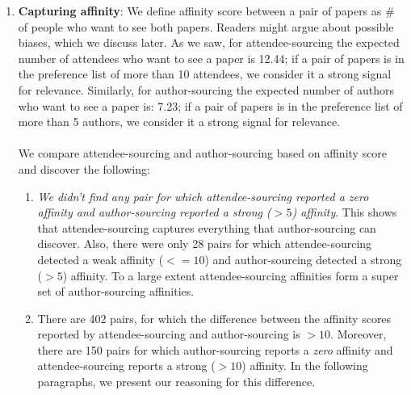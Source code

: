 \documentclass[letterpaper]{article}
\begin{document}
\begin{enumerate}
\item \textbf{Capturing affinity}: We define affinity score between a pair of papers as \# of people who want to see both papers. Readers might argue about possible biases, which we discuss later. As we saw, for attendee-sourcing the expected number of attendees who want to see a paper is 12.44; if a pair of papers is in the preference list of more than 10 attendees, we consider it a strong signal for relevance. Similarly, for author-sourcing the expected number of authors who want to see a paper is: 7.23; if a pair of papers is in the preference list of more than 5 authors, we consider it a strong signal for relevance.
\\
\\
We compare attendee-sourcing and author-sourcing based on affinity score and discover the following:
\begin{enumerate}
\item \emph{We didn't find any pair for which attendee-sourcing reported a zero affinity and author-sourcing reported a strong ($>5$) affinity}. This shows that attendee-sourcing captures everything that author-sourcing can discover. Also, there were only 28 pairs for which attendee-sourcing detected a weak affinity ($<=10$) and author-sourcing detected a strong ($>5$) affinity. To a large extent attendee-sourcing affinities form a super set of author-sourcing affinities.

\item There are 402 pairs, for which the difference between the affinity scores reported by attendee-sourcing and author-sourcing is $>10$. Moreover, there are 150 pairs for which author-sourcing reports a \emph{zero} affinity and attendee-sourcing reports a strong ($>10$) affinity. In the following paragraphs, we present our reasoning for this difference.


\end{enumerate}
\end{enumerate}
\end{document}
